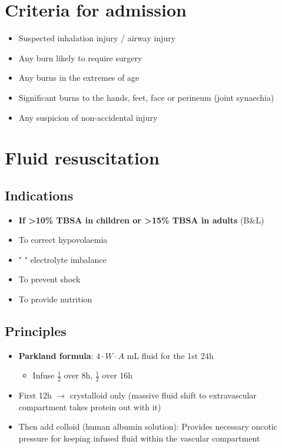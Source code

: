 \documentclass[
  12pt,
]{memoir}
\providecommand{\tightlist}{%
  \setlength{\itemsep}{0pt}\setlength{\parskip}{0pt}}
\begin{document}
\hypertarget{criteria-for-admission}{%
\section{Criteria for admission}\label{criteria-for-admission}}

\begin{itemize}
\tightlist
\item
  Suspected inhalation injury / airway injury
\item
  Any burn likely to require surgery
\item
  Any burns in the extremes of age
\item
  Significant burns to the hands, feet, face or perineum (joint
  synaechia)
\item
  Any suspicion of non-accidental injury
\end{itemize}

\hypertarget{fluid-resuscitation}{%
\section{Fluid resuscitation}\label{fluid-resuscitation}}

\hypertarget{indications-1}{%
\subsection{Indications}\label{indications-1}}

\begin{itemize}
\tightlist
\item
  \textbf{If \textgreater10\% TBSA in children or \textgreater15\% TBSA
  in adults} (B\&L)
\item
  To correct hypovolaemia
\item
  " " electrolyte imbalance
\item
  To prevent shock
\item
  To provide nutrition
\end{itemize}

\hypertarget{principles}{%
\subsection{Principles}\label{principles}}

\begin{itemize}
\tightlist
\item
  \textbf{Parkland formula}: \(4\cdot W \cdot A\) mL fluid for the 1st
  24h

  \begin{itemize}
  \tightlist
  \item
    Infuse \(\frac{1}{2}\) over 8h, \(\frac{1}{2}\) over 16h
  \end{itemize}
\item
  First 12h \(\rightarrow\) crystalloid only (massive fluid shift to
  extravascular compartment takes protein out with it)
\item
  Then add colloid (human albumin solution): Provides necessary oncotic
  pressure for keeping infused fluid within the vascular compartment
\end{itemize}
\end{document}
